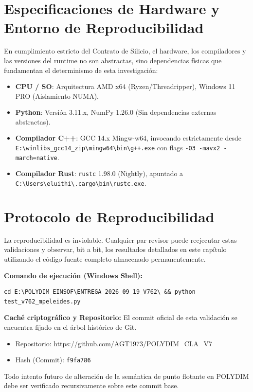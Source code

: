 \section{Especificaciones de Hardware y Entorno de Reproducibilidad}
En cumplimiento estricto del Contrato de Silicio, el hardware, los compiladores y las versiones del runtime no son abstractas, sino dependencias físicas que fundamentan el determinismo de esta investigación:
\begin{itemize}
    \item \textbf{CPU / SO}: Arquitectura AMD x64 (Ryzen/Threadripper), Windows 11 PRO (Aislamiento NUMA).
    \item \textbf{Python}: Versión 3.11.x, NumPy 1.26.0 (Sin dependencias externas abstractas).
    \item \textbf{Compilador C++}: GCC 14.x Mingw-w64, invocando estrictamente desde \texttt{E:\textbackslash winlibs\_gcc14\_zip\textbackslash mingw64\textbackslash bin\textbackslash g++.exe} con flags \texttt{-O3 -mavx2 -march=native}.
    \item \textbf{Compilador Rust}: \texttt{rustc} 1.98.0 (Nightly), apuntado a \texttt{C:\textbackslash Users\textbackslash eluithi\textbackslash .cargo\textbackslash bin\textbackslash rustc.exe}.
\end{itemize}

\section{Protocolo de Reproducibilidad}
La reproducibilidad es inviolable. Cualquier par revisor puede reejecutar estas validaciones y observar, bit a bit, los resultados detallados en este capítulo utilizando el código fuente completo almacenado permanentemente.

\textbf{Comando de ejecución (Windows Shell):}
\begin{verbatim}
cd E:\POLYDIM_EINSOF\ENTREGA_2026_09_19_V762\ && python test_v762_mpeleides.py
\end{verbatim}

\textbf{Caché criptográfico y Repositorio:} El commit oficial de esta validación se encuentra fijado en el árbol histórico de Git.
\begin{itemize}
    \item Repositorio: \url{https://github.com/AGT1973/POLYDIM_CLA_V7}
    \item Hash (Commit): \texttt{f9fa786}
\end{itemize}
Todo intento futuro de alteración de la semántica de punto flotante en POLYDIM debe ser verificado recursivamente sobre este commit base.
